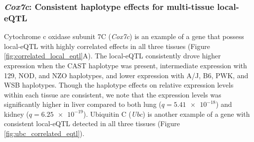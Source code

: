 \documentclass[9pt,twocolumn,twoside]{gsajnl}
\begin{document}
\subsubsection{\textit{Cox7c}: Consistent haplotype effects for multi-tissue local-eQTL}
Cytochrome c oxidase subunit 7C (\textit{Cox7c}) is an example of a gene that possess local-eQTL with highly correlated effects in all three tissues (Figure \ref{fig:correlated_local_eqtl}A).
The local-eQTL consistently drove higher expression when the CAST haplotype was present, intermediate expression with 129, NOD, and NZO haplotypes, and lower expression with A/J, B6, PWK, and WSB haplotypes. Though the haplotype effects on relative expression levels within each tissue are consistent, we note that the expression levels was significantly higher in liver compared to both lung ($q = \num{5.41e-18}$) and kidney ($q = \num{6.25e-19}$). Ubiquitin C (\textit{Ubc}) is another example of a gene with consistent local-eQTL detected in all three tissues (Figure \ref{fig:ubc_correlated_eqtl}).


\end{document}
